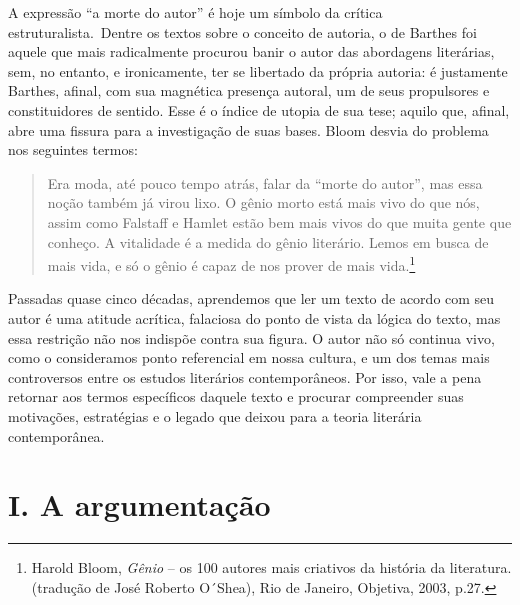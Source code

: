 A expressão ``a morte do autor'' é hoje um símbolo da crítica
estruturalista.~Dentre os textos sobre o conceito de autoria, o de
Barthes foi aquele que mais radicalmente procurou banir o autor das
abordagens literárias, sem, no entanto, e ironicamente, ter se libertado
da própria autoria: é justamente Barthes, afinal, com sua magnética
presença autoral, um de seus propulsores e constituidores de sentido.
Esse é o índice de utopia de sua tese; aquilo que, afinal, abre uma
fissura para a investigação de suas bases. Bloom desvia do problema nos
seguintes termos:

\begin{quote}
Era moda, até pouco tempo atrás, falar da ``morte do autor'', mas essa
noção também já virou lixo. O gênio morto está mais vivo do que nós,
assim como Falstaff e Hamlet estão bem mais vivos do que muita gente que
conheço. A vitalidade é a medida do gênio literário. Lemos em busca de
mais vida, e só o gênio é capaz de nos prover de mais vida.\footnote{Harold
  Bloom, \emph{Gênio} -- os 100 autores mais criativos da história da
  literatura. (tradução de José Roberto O´Shea), Rio de Janeiro,
  Objetiva, 2003, p.27.}
\end{quote}

Passadas quase cinco décadas, aprendemos que ler um texto de acordo com
seu autor é uma atitude acrítica, falaciosa do ponto de vista da lógica
do texto, mas essa restrição não nos indispõe contra sua figura. O autor
não só continua vivo, como o consideramos ponto referencial em nossa
cultura, e um dos temas mais controversos entre os estudos literários
contemporâneos. Por isso, vale a pena retornar aos termos específicos
daquele texto e procurar compreender suas motivações, estratégias e o
legado que deixou para a teoria literária contemporânea.

\section*{I. A argumentação}


